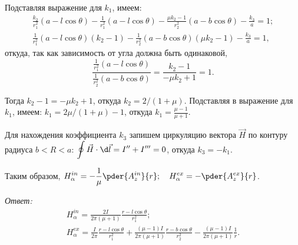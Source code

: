 Подставляя выражение для \( k_1 \), имеем:
\begin{gather*}
    \frac{k_2}{r_1^2}(a - l\cos\theta) - \frac{1}{r_1^2}(a - l\cos\theta) -
    \frac{\mu k_2 - 1}{r_2^2}(a - b\cos\theta) - \frac{k_3}{a} =  1;\\
    \frac{1}{r_1^2}(a - l\cos\theta)(k_2 - 1) - \frac{1}{r_2^2}(a - b\cos\theta)
    (\mu k_2 - 1) - \frac{k_3}{a} = 1,
\end{gather*}
откуда, так как зависимость от угла должна быть одинаковой,
\[
    \frac{\frac{1}{r_1^2}(a - l\cos\theta)}{\frac{1}{r_2^2}(a - b\cos\theta)} =
    \frac{k_2 - 1}{-\mu k_2 + 1} = 1.
\]

Тогда \( k_2 - 1 = -\mu k_2 + 1 \), откуда \( k_2 = 2/(1 + \mu) \). Подставляя
в выражение для \( k_1 \), имеем: \( k_1 = 2\mu/(1 + \mu) - 1 \), откуда
\( k_1 = \frac{\mu - 1}{\mu + 1} \).

Для нахождения коэффициента \( k_3 \) запишем циркуляцию вектора \( \vec{H} \)
по контуру радиуса \( b < R < a \):
\( \ds \oint\vec{H}\cdot\d\vec{l} = I'' + I''' = 0 \), откуда \( k_3 = -k_1 \).

Таким образом, \( \ds H_\alpha^{in} = -\frac{1}{\mu}\pder{A_z^{in}}{r}; \quad
    H_\alpha^{ex} = -\pder{A_z^{ex}}{r} \).

\vspace*{1.5em}
\emph{Ответ:}
\vspace*{-2.7em}
\begin{gather*}
    H_\alpha^{in} = \frac{2I}{2\pi(\mu + 1)}\frac{r - l\cos\theta}{r_1^2}; \\
    H_\alpha^{ex} = \frac{I}{2\pi}\frac{r - l\cos\theta}{r_1^2} +
    \frac{(\mu - 1)I}{2\pi(\mu + 1)}\frac{r - b\cos\theta}{r_2^2} -
    \frac{(\mu - 1)I}{2\pi(\mu + 1)}\frac{1}{r}.
\end{gather*}

